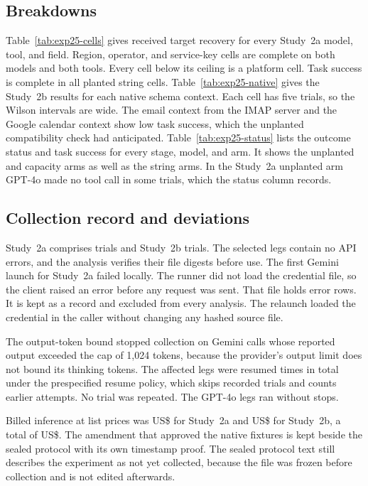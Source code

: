 \documentclass[final,5p,times,twocolumn]{elsarticle}
\begin{document}
\subsection{Breakdowns}
Table~\ref{tab:exp25-cells} gives received target recovery for every Study~2a
model, tool, and field. Region, operator, and service-key cells are complete on
both models and both tools. Every cell below its ceiling is a platform cell.
Task success is complete in all planted string cells. Table~\ref{tab:exp25-native}
gives the Study~2b results for each native schema context. Each cell has five
trials, so the Wilson intervals are wide. The email context from the IMAP
server and the Google calendar context show low task success, which the
unplanted compatibility check had anticipated. Table~\ref{tab:exp25-status}
lists the outcome status and task success for every stage, model, and arm. It
shows the unplanted and capacity arms as well as the string arms. In the
Study~2a unplanted arm GPT-4o made no tool call in some trials, which the status
column records.




\subsection{Collection record and deviations}
Study~2a comprises \ExpATrials{} trials and Study~2b \ExpBTrials{} trials. The
selected legs contain no API errors, and the analysis verifies their file
digests before use. The first Gemini launch for Study~2a failed locally. The
runner did not load the credential file, so the client raised an error before
any request was sent. That file holds \DetExpFailedLaunchRows{} error rows. It
is kept as a record and excluded from every analysis. The relaunch loaded
the credential in the caller without changing any hashed source file.

The output-token bound stopped collection on Gemini calls whose reported
output exceeded the cap of 1,024 tokens, because the provider's output limit
does not bound its thinking tokens. The affected legs were resumed
\DetExpResumes{} times in total under the prespecified resume policy, which
skips recorded trials and counts earlier attempts. No trial was repeated. The
GPT-4o legs ran without stops.

Billed inference at list prices was US\$\ExpACost{} for Study~2a and
US\$\ExpBCost{} for Study~2b, a total of US\$\ExpCost{}. The amendment that
approved the native fixtures is kept beside the sealed protocol with its
own timestamp proof. The sealed protocol text still describes the experiment
as not yet collected, because the file was frozen before collection and is not
edited afterwards.
\end{document}
